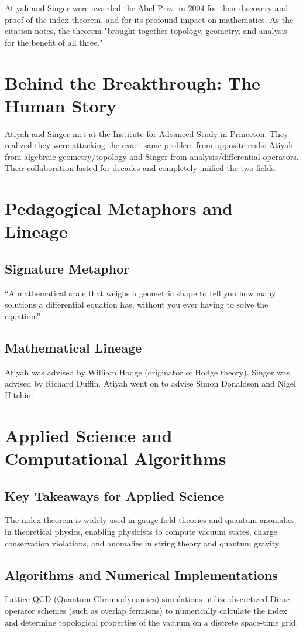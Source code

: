 Atiyah and Singer were awarded the Abel Prize in 2004 for their discovery and proof of the index theorem, and for its profound impact on mathematics. As the citation notes, the theorem "brought together topology, geometry, and analysis for the benefit of all three."


\section{Behind the Breakthrough: The Human Story}
Atiyah and Singer met at the Institute for Advanced Study in Princeton. They realized they were attacking the exact same problem from opposite ends: Atiyah from algebraic geometry/topology and Singer from analysis/differential operators. Their collaboration lasted for decades and completely unified the two fields.

\section{Pedagogical Metaphors and Lineage}
\subsection{Signature Metaphor}
``A mathematical scale that weighs a geometric shape to tell you how many solutions a differential equation has, without you ever having to solve the equation.''

\subsection{Mathematical Lineage}
Atiyah was advised by William Hodge (originator of Hodge theory). Singer was advised by Richard Duffin. Atiyah went on to advise Simon Donaldson and Nigel Hitchin.

\section{Applied Science and Computational Algorithms}
\subsection{Key Takeaways for Applied Science}
The index theorem is widely used in gauge field theories and quantum anomalies in theoretical physics, enabling physicists to compute vacuum states, charge conservation violations, and anomalies in string theory and quantum gravity.

\subsection{Algorithms and Numerical Implementations}
Lattice QCD (Quantum Chromodynamics) simulations utilize discretized Dirac operator schemes (such as overlap fermions) to numerically calculate the index and determine topological properties of the vacuum on a discrete space-time grid.


